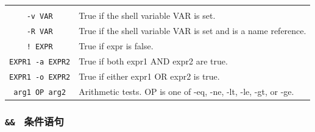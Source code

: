 \documentclass[doctor,openright,twoside]{sjtuthesis}
\newcommand{\passthrough}[1]{#1}
\theoremstyle{plain}
\theoremstyle{definition}
\theoremstyle{remark}
\theoremstyle{ocrenumbox}
\theoremstyle{plain}
\begin{document}
\begin{longtable}[]{@{}cl@{}}
\begin{minipage}[t]{0.74\columnwidth}
\end{minipage}\tabularnewline
\begin{minipage}[t]{0.20\columnwidth}\centering
\passthrough{\lstinline!-v VAR!}\strut
\end{minipage} & \begin{minipage}[t]{0.74\columnwidth}\raggedright
True if the shell variable VAR is set.\strut
\end{minipage}\tabularnewline
\begin{minipage}[t]{0.20\columnwidth}\centering
\passthrough{\lstinline!-R VAR!}\strut
\end{minipage} & \begin{minipage}[t]{0.74\columnwidth}\raggedright
True if the shell variable VAR is set and is a name reference.\strut
\end{minipage}\tabularnewline
\begin{minipage}[t]{0.20\columnwidth}\centering
\passthrough{\lstinline"! EXPR"}\strut
\end{minipage} & \begin{minipage}[t]{0.74\columnwidth}\raggedright
True if expr is false.\strut
\end{minipage}\tabularnewline
\begin{minipage}[t]{0.20\columnwidth}\centering
\passthrough{\lstinline!EXPR1 -a EXPR2!}\strut
\end{minipage} & \begin{minipage}[t]{0.74\columnwidth}\raggedright
True if both expr1 AND expr2 are true.\strut
\end{minipage}\tabularnewline
\begin{minipage}[t]{0.20\columnwidth}\centering
\passthrough{\lstinline!EXPR1 -o EXPR2!}\strut
\end{minipage} & \begin{minipage}[t]{0.74\columnwidth}\raggedright
True if either expr1 OR expr2 is true.\strut
\end{minipage}\tabularnewline
\begin{minipage}[t]{0.20\columnwidth}\centering
\passthrough{\lstinline!arg1 OP arg2!}\strut
\end{minipage} & \begin{minipage}[t]{0.74\columnwidth}\raggedright
Arithmetic tests. OP is one of -eq, -ne, -lt, -le, -gt, or -ge.\strut
\end{minipage}\tabularnewline
\bottomrule
\end{longtable}

\subsubsection{\texorpdfstring{\texttt{\&\&\ \textbar{}\textbar{}}
条件语句}{\&\& \textbar{}\textbar{} 条件语句}}
\end{document}
